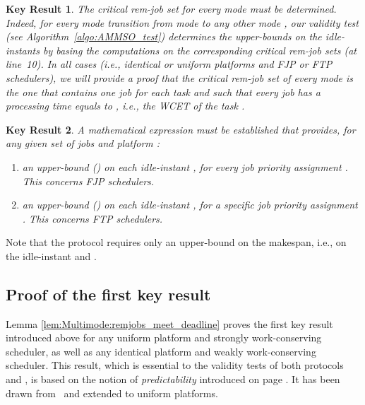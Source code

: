 \documentclass{article}
\newtheorem{validity test}{Validity Test}
\newtheorem{KeyResult}{Key Result}
\begin{document}
\begin{KeyResult}
The critical rem-job set  for every mode  must be determined. Indeed, for every mode transition from mode  to any other mode , our validity test (see Algorithm~\ref{algo:AMMSO_test}) determines the upper-bounds on the idle-instants by basing the computations on the corresponding critical rem-job sets  (at line~10). In all cases (i.e., identical or uniform platforms and FJP or FTP schedulers), we will provide a proof that the critical rem-job set  of every mode  is the one that contains one job  for each task  and such that every job  has a processing time equals to , i.e., the WCET of the task .
\end{KeyResult}

\begin{KeyResult}
A mathematical expression must be established that provides, for any given set  of jobs and platform :
\begin{enumerate}
\item an upper-bound  () on each idle-instant , for every job priority assignment . This concerns FJP schedulers.
\item an upper-bound  () on each idle-instant , for a specific job priority assignment . This concerns FTP schedulers.
\end{enumerate}
\end{KeyResult}

Note that the protocol  requires only an upper-bound on the makespan, i.e., on the  idle-instant  and .

\subsection{Proof of the first key result}
\label{sec:Multimode:prelim_validity_tests_first_result}

Lemma \ref{lem:Multimode:remjobs_meet_deadline} proves the first key result introduced above for any uniform platform and strongly work-conserving scheduler, as well as any identical platform and weakly work-conserving scheduler. This result, which is essential to the validity tests of both protocols  and , is based on the notion of \emph{predictability} introduced on page \pageref{def:Multimode:predictability}. It has been drawn from~\cite{NelisGoossensAndersson:09} and extended to uniform platforms.
\end{document}
